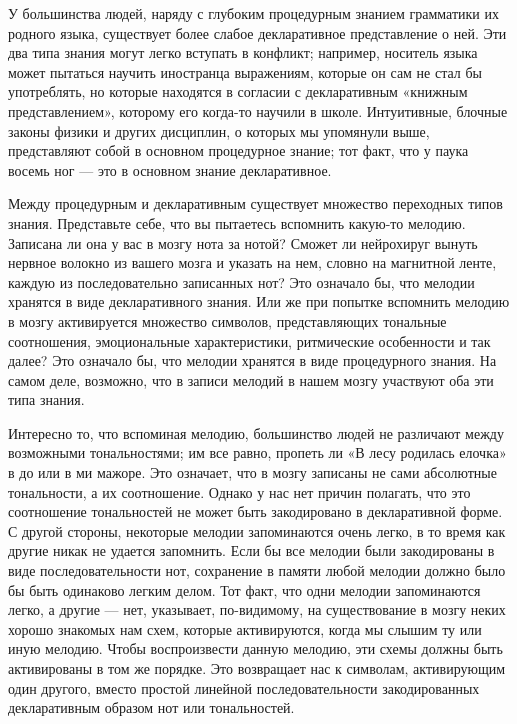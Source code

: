 \documentclass[../main.tex]{subfiles}
\begin{document}
У большинства людей, наряду с глубоким процедурным знанием грамматики их родного языка, существует более слабое декларативное представление о ней. Эти два типа знания могут легко вступать в конфликт; например, носитель языка может пытаться научить иностранца выражениям, которые он сам не стал бы употреблять, но которые находятся в согласии с декларативным «книжным представлением», которому его когда-то научили в школе. Интуитивные, блочные законы физики и других дисциплин, о которых мы упомянули выше, представляют собой в основном процедурное знание; тот факт, что у паука восемь ног --- это в основном знание декларативное.

Между процедурным и декларативным существует множество переходных типов знания. Представьте себе, что вы пытаетесь вспомнить какую-то мелодию. Записана ли она у вас в мозгу нота за нотой? Сможет ли нейрохируг вынуть нервное волокно из вашего мозга и указать на нем, словно на магнитной ленте, каждую из последовательно записанных нот? Это означало бы, что мелодии хранятся в виде декларативного знания. Или же при попытке вспомнить мелодию в мозгу активируется множество символов, представляющих тональные соотношения, эмоциональные характеристики, ритмические особенности и так далее? Это означало бы, что мелодии хранятся в виде процедурного знания. На самом деле, возможно, что в записи мелодий в нашем мозгу участвуют оба эти типа знания.

Интересно то, что вспоминая мелодию, большинство людей не различают между возможными тональностями; им все равно, пропеть ли «В лесу родилась елочка» в до или в ми мажоре. Это означает, что в мозгу записаны не сами абсолютные тональности, а их соотношение. Однако у нас нет причин полагать, что это соотношение тональностей не может быть закодировано в декларативной форме. С другой стороны, некоторые мелодии запоминаются очень легко, в то время как другие никак не удается запомнить. Если бы все мелодии были закодированы в виде последовательности нот, сохранение в памяти любой мелодии должно было бы быть одинаково легким делом. Тот факт, что одни мелодии запоминаются легко, а другие --- нет, указывает, по-видимому, на существование в мозгу неких хорошо знакомых нам схем, которые активируются, когда мы слышим ту или иную мелодию. Чтобы воспроизвести данную мелодию, эти схемы должны быть активированы в том же порядке. Это возвращает нас к символам, активирующим один другого, вместо простой линейной последовательности закодированных декларативным образом нот или тональностей.
\end{document}
